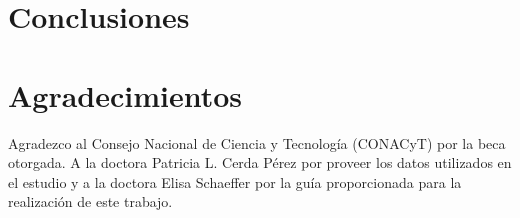 \documentclass[final,5p,times]{elsarticle}
\begin{document}
\section{Conclusiones} \label{conclusiones}






\begin{thebibliography}{00}



\end{thebibliography}

\section*{Agradecimientos}

Agradezco al Consejo Nacional de Ciencia y Tecnolog\'ia (CONACyT) por la beca otorgada. A la doctora Patricia L. Cerda P\'erez por proveer los datos utilizados en el estudio y a la doctora Elisa Schaeffer por la gu\'ia proporcionada para la realizaci\'on de este trabajo.


\end{document}

